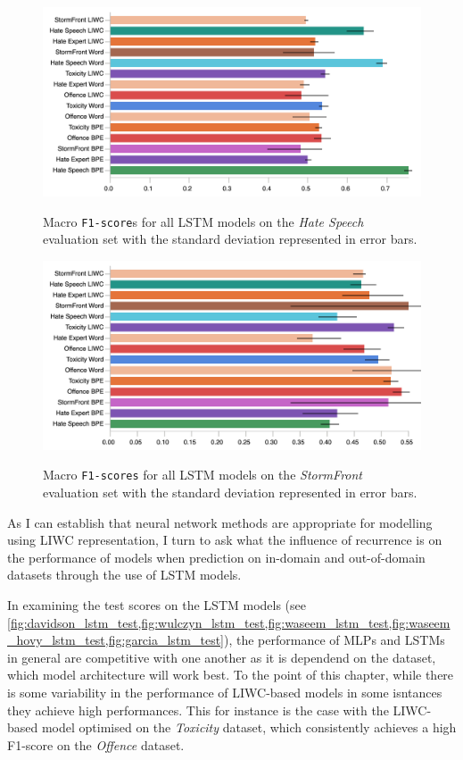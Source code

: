 \begin{figure}
\begin{minipage}{\textwidth}
    \centering
    \includegraphics[width=\textwidth]{all_lstm_waseem_hovy_test.pdf}
    \caption{Macro \texttt{F1-score}s for all LSTM models on the \textit{Hate Speech} evaluation set with the standard deviation represented in error bars.}
  \label{fig:waseem_hovy_lstm_test}  
  \vfill
    \includegraphics[width=\textwidth]{all_lstm_garcia_test.pdf}
  \caption{Macro \texttt{F1-scores} for all LSTM models on the \textit{StormFront} evaluation set with the standard deviation represented in error bars.}
  \label{fig:garcia_lstm_test}
\end{minipage}
\end{figure}
As I can establish that neural network methods are appropriate for modelling using LIWC representation, I turn to ask what the influence of recurrence is on the performance of models when prediction on in-domain and out-of-domain datasets through the use of LSTM models.

In examining the test scores on the LSTM models (see \cref{fig:davidson_lstm_test,fig:wulczyn_lstm_test,fig:waseem_lstm_test,fig:waseem_hovy_lstm_test,fig:garcia_lstm_test}), the performance of MLPs and LSTMs in general are competitive with one another as it is dependend on the dataset, which model architecture will work best.
To the point of this chapter, while there is some variability in the performance of LIWC-based models in some isntances they achieve high performances. 
This for instance is the case with the LIWC-based model optimised on the \textit{Toxicity} dataset, which consistently achieves a high F1-score on the \textit{Offence} dataset.

